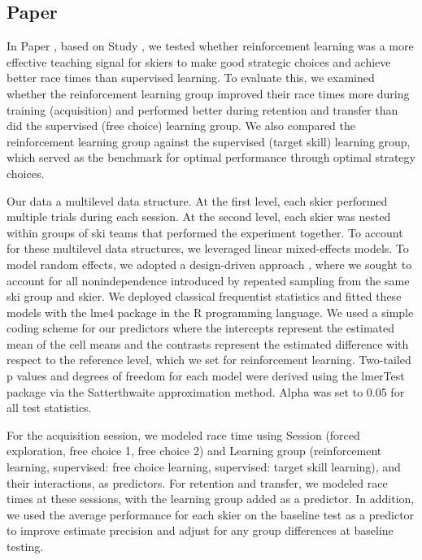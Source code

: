 \subsection{Paper }
In Paper , based on Study , we tested whether reinforcement learning was a more effective teaching signal for skiers to make good strategic choices and achieve better race times than supervised learning. To evaluate this, we examined whether the reinforcement learning group improved their race times more during training (acquisition) and performed better during retention and transfer than did the supervised (free choice) learning group. We also compared the reinforcement learning group against the supervised (target skill) learning group, which served as the benchmark for optimal performance through optimal strategy choices.

Our data a multilevel data structure. At the first level, each skier performed multiple trials during each session. At the second level, each skier was nested within groups of ski teams that performed the experiment together. To account for these multilevel data structures, we leveraged linear mixed-effects models. To model random effects, we adopted a design-driven approach \cite{barr_random_2013, barr_learning_2021}, where we sought to account for all nonindependence introduced by repeated sampling from the same ski group and skier. We deployed classical frequentist statistics and fitted these models with the lme4 package \cite{bates_fitting_2015} in the R \cite{r_core_team_r_2022} programming language. We used a simple coding scheme for our predictors where the intercepts represent the estimated mean of the cell means and the contrasts represent the estimated difference with respect to the reference level, which we set for reinforcement learning. Two-tailed p values and degrees of freedom for each model were derived using the lmerTest package \cite{kuznetsova_lmertest_2017} via the Satterthwaite approximation method. Alpha was set to 0.05 for all test statistics.

For the acquisition session, we modeled race time using Session (forced exploration, free choice 1, free choice 2) and Learning group (reinforcement learning, supervised: free choice learning, supervised: target skill learning), and their interactions, as predictors. For retention and transfer, we modeled race times at these sessions, with the learning group added as a predictor. In addition, we used the average performance for each skier on the baseline test as a predictor to improve estimate precision and adjust for any group differences at baseline testing. 

